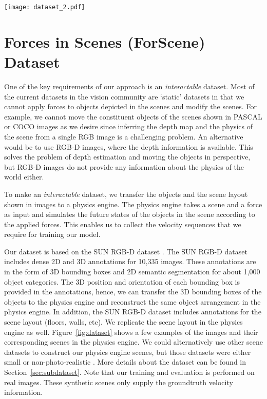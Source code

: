 \documentclass[runningheads]{llncs}
\begin{document}
\begin{figure*}[t]
\centering
  \texttt{[image: dataset\_2.pdf]}
\caption{\textbf{Synthetic scenes.} These example scenes are synthesized automatically from the images in the SUN RGB-D \cite{sunrgbd} dataset. Left: the original image, Middle: point cloud representation, Right: synthetic scene. The objects that belong to the same category are shown with the same color. For clarity, we do not visualize the walls.}  
\label{fig:dataset}
\end{figure*} 

\section{Forces in Scenes (ForScene) Dataset} 
\label{sec:dataset}
One of the key requirements of our approach is an \emph{interactable} dataset. Most of the current datasets in the vision community are `static' datasets in that we cannot apply forces to objects depicted in the scenes and modify the scenes. For example, we cannot move the constituent objects of the scenes shown in PASCAL \cite{everingham10} or COCO \cite{lin14} images as we desire since inferring the depth map and the physics of the scene from a single RGB image is a challenging problem. An alternative would be to use RGB-D images, where the depth information is available. This solves the problem of depth estimation and moving the objects in perspective, but RGB-D images do not provide any information about the physics of the world either. 

To make an \emph{interactable} dataset, we transfer the objects and the scene layout shown in images to a physics engine. The physics engine takes a scene and a force as input and simulates the future states of the objects in the scene according to the applied forces. This enables us to collect the velocity sequences that we require for training our model.

Our dataset is based on the SUN RGB-D dataset \cite{sunrgbd}. The SUN RGB-D dataset includes dense 2D and 3D annotations for 10,335 images. These annotations are in the form of 3D bounding boxes and 2D semantic segmentation for about 1,000 object categories. The 3D position and orientation of each bounding box is provided in the annotations, hence, we can transfer the 3D bounding boxes of the objects to the physics engine and reconstruct the same object arrangement in the physics engine. In addition, the SUN RGB-D dataset includes annotations for the scene layout (floors, walls, etc). We replicate the scene layout in the physics engine as well. Figure~\ref{fig:dataset} shows a few examples of the images and their corresponding scenes in the physics engine. We could alternatively use other scene datasets to construct our physics engine scenes, but those datasets were either small \cite{silberman12} or non-photo-realistic \cite{scenenet}. More details about the dataset can be found in Section~\ref{sec:subdataset}. Note that our training and evaluation is performed on real images. These synthetic scenes only supply the groundtruth velocity information.
\end{document}
